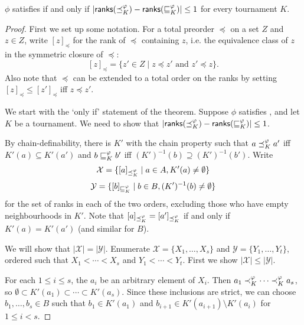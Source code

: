 \begin{theorem}
    \label{tourn_result_chain_def_ranks_characterisation}

    $\phi$ satisfies  if and only if $|\mathsf{ranks}({\preceq_K^\varphi})
    - \mathsf{ranks}({\sqsubseteq_K^\varphi})| \le 1$ for every tournament $K$.
\end{theorem}

\begin{proof}

    First we set up some notation. For a total preorder $\preceq$ on a set $Z$
    and $z \in Z$, write $[z]_{\preceq}$ for the rank of ${\preceq}$ containing
    $z$, i.e. the equivalence class of $z$ in the symmetric closure of
    ${\preceq}$:
    \[
        [z]_{\preceq}
        = \{z' \in Z \mid z \preceq z' \text{ and } z' \preceq z\}.
    \]
    Also note that $\preceq$ can be extended to a total order on the ranks by
    setting $[z]_{\preceq} \le [z']_{\preceq}$ iff $z \preceq z'$.

    We start with the `only if' statement of the theorem. Suppose
    $\phi$ satisfies , and let $K$ be a tournament. We need
    to show that $|\mathsf{ranks}({\preceq_K^\varphi}) - \mathsf{ranks}({\sqsubseteq_K^\varphi})| \le 1$.

    By chain-definability, there is $K'$ with the chain property such that $a
    \preceq_K^\varphi a'$ iff $K'(a) \subseteq K'(a')$ and $b \sqsubseteq_K^\varphi b'$ iff
    $(K')^{-1}(b) \supseteq (K')^{-1}(b')$. Write
    \[ \mathcal{X} = \{ [a]_{\preceq_K^\varphi} \mid a \in A, K'(a) \ne \emptyset \} \]
    \[ \mathcal{Y} = \{ [b]_{\sqsubseteq_K^\varphi} \mid b \in B, (K')^{-1}(b) \ne \emptyset \} \]
    for the set of ranks in each of the two orders, excluding those who have
    empty neighbourhoods in $K'$. Note that $[a]_{\preceq_K^\varphi} =
    [a']_{\preceq_K^\varphi}$ if and only if $K'(a) = K'(a')$ (and similar for $B$).

    We will show that $|\mathcal{X}| = |\mathcal{Y}|$. Enumerate $\mathcal{X} =
    \{X_1,\ldots,X_s\}$ and $\mathcal{Y} = \{Y_1,\ldots,Y_t\}$, ordered such
    that $X_1 < \cdots < X_s$ and $Y_1 < \cdots < Y_t$. First we show
    $|\mathcal{X}| \le |\mathcal{Y}|$.

    For each $1 \le i \le s$, the $a_i$ be an arbitrary element of $X_i$. Then
    $a_1 \prec_K^\varphi \cdots \prec_K^\varphi a_s$, so $\emptyset \subset K'(a_1)
    \subset \cdots \subset K'(a_s)$. Since these inclusions are strict, we can
    choose $b_1,\ldots,b_s \in B$ such that $b_1 \in K'(a_1)$ and $b_{i+1} \in
    K'(a_{i+1}) \setminus K'(a_i)$ for $1 \le i < s$.


\end{proof}
